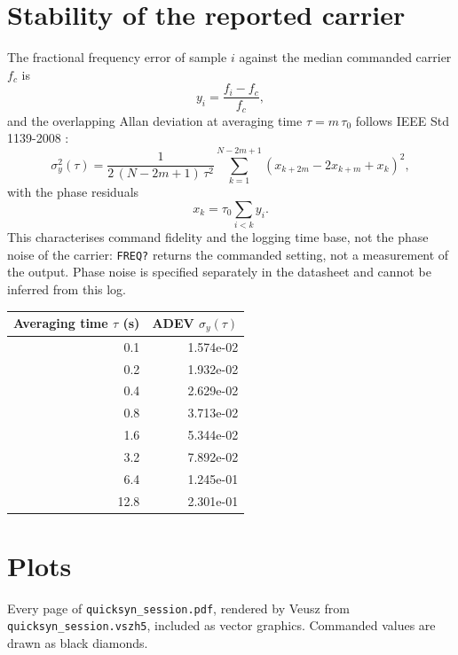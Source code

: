 \documentclass[11pt]{article}
\begin{document}
\section{Stability of the reported carrier}

The fractional frequency error of sample $i$ against the median
commanded carrier $f_c$ is
\begin{equation}
  y_i = \frac{f_i - f_c}{f_c},
\end{equation}
and the overlapping Allan deviation at averaging time $\tau = m\,\tau_0$
follows IEEE Std 1139-2008 \cite{ieee1139}:
\begin{equation}
  \sigma_y^2(\tau) = \frac{1}{2\,(N-2m+1)\,\tau^2}
  \sum_{k=1}^{N-2m+1}\left(x_{k+2m} - 2x_{k+m} + x_k\right)^2,
\end{equation}
with the phase residuals
\begin{equation}
  x_k = \tau_0 \sum_{i<k} y_i .
\end{equation}
This characterises command fidelity and the logging time base, not the
phase noise of the carrier: \texttt{FREQ?} returns the commanded setting,
not a measurement of the output. Phase noise is specified separately in
the datasheet \cite{nidatasheet} and cannot be inferred from this log.

\begin{center}
\begin{tabular}{@{}rr@{}}
\toprule
\textbf{Averaging time $\tau$ (s)} & \textbf{ADEV $\sigma_y(\tau)$} \\
\midrule
0.1 & 1.574e-02 \\
0.2 & 1.932e-02 \\
0.4 & 2.629e-02 \\
0.8 & 3.713e-02 \\
1.6 & 5.344e-02 \\
3.2 & 7.892e-02 \\
6.4 & 1.245e-01 \\
12.8 & 2.301e-01 \\
\bottomrule
\end{tabular}
\end{center}

\clearpage
\section{Plots}

Every page of \texttt{quicksyn\_session.pdf}, rendered by
Veusz \cite{veusz} from \texttt{quicksyn\_session.vszh5}, included as vector
graphics. Commanded values are drawn as black diamonds.
\end{document}
